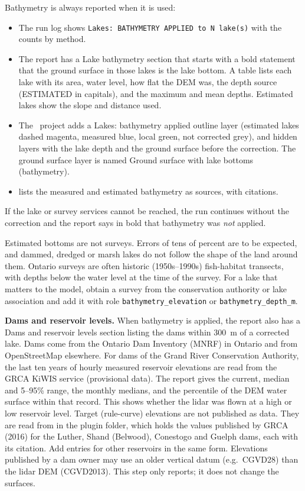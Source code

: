         Bathymetry is always reported when it is used:
        \begin{itemize}
        \item The run log shows {\tt Lakes: BATHYMETRY APPLIED to N lake(s)} with the counts by method.
        \item The report has a {\sf Lake bathymetry} section that starts with a bold statement that the ground surface in those lakes is the lake bottom.  A table lists each lake with its area, water level, how flat the DEM was, the depth source (ESTIMATED in capitals), and the maximum and mean depths.  Estimated lakes show the slope and distance used.
        \item The \qgis\ project adds a {\sf Lakes: bathymetry applied} outline layer (estimated lakes dashed magenta, measured blue, local green, not corrected grey), and hidden layers with the lake depth and the ground surface before the correction.  The ground surface layer is named {\sf Ground surface with lake bottoms (bathymetry)}.
        \item {} lists the measured and estimated bathymetry as sources, with citations.
        \end{itemize}
        If the lake or survey services cannot be reached, the run continues without the correction and the report says in bold that bathymetry was {\em not} applied.

        Estimated bottoms are not surveys.  Errors of tens of percent are to be expected, and dammed, dredged or marsh lakes do not follow the shape of the land around them.  Ontario surveys are often historic (1950s--1990s) fish-habitat transects, with depths below the water level at the time of the survey.  For a lake that matters to the model, obtain a survey from the conservation authority or lake association and add it with role {\tt bathymetry\_elevation} or {\tt bathymetry\_depth\_m}.

        \textbf{Dams and reservoir levels.}  When bathymetry is applied, the report also has a {\sf Dams and reservoir levels} section listing the dams within 300~m of a corrected lake.  Dams come from the Ontario Dam Inventory (MNRF) in Ontario and from OpenStreetMap elsewhere.  For dams of the Grand River Conservation Authority, the last ten years of hourly measured reservoir elevations are read from the GRCA KiWIS service (provisional data).  The report gives the current, median and 5--95\% range, the monthly medians, and the percentile of the DEM water surface within that record.  This shows whether the lidar was flown at a high or low reservoir level.  Target (rule-curve) elevations are not published as data.  They are read from  in the plugin folder, which holds the values published by GRCA (2016) for the Luther, Shand (Belwood), Conestogo and Guelph dams, each with its citation.  Add entries for other reservoirs in the same form.  Elevations published by a dam owner may use an older vertical datum (e.g.\ CGVD28) than the lidar DEM (CGVD2013).  This step only reports; it does not change the surfaces.

